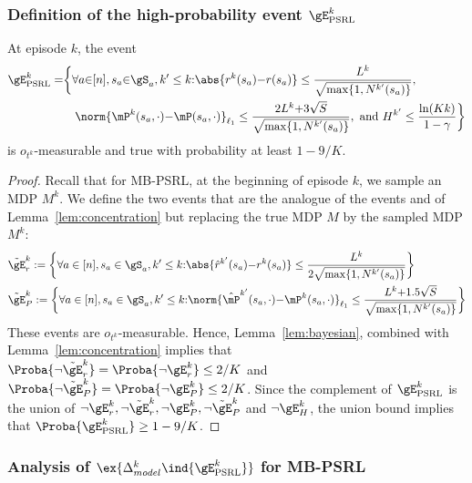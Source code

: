 \begin{subappendices}
\subsubsection{Definition of the high-probability event $\gE_\text{PSRL}^{k}$}

\begin{lem}
    \label{lem:concentration_psrl}
    At episode $k$, the event
    \begin{align*}
        \gE_\text{PSRL}^{k} =
        &\bigg\{ \forall a{\in}[n], s_a{\in}\gS_a, k'\le k{:}
            \abs{r^{k}(s_a){-}r(s_a)} \le\frac{L^{k}}{\sqrt{\max\{1,N^{k'}(s_a)\} }}, \\
        &\quad\norm{\mP^{k}(s_a,\cdot) {-}\mP(s_a,\cdot)}_{\ell_1} \le\frac{2L^{k}{+}3\sqrt{S}}{\sqrt{\max\{1,N^{k'}(s_a)\} }}, \text{ and } H^{k'}\le \frac{\ln(Kk)}{1-\gamma} \bigg\}
    \end{align*}
    is $o_{t^k}$-measurable and true with probability at least $1-9/K$.
\end{lem}

\begin{proof}
    Recall that for MB-PSRL, at the beginning of episode $k$, we sample an MDP $M^{k}$. We define the two events that are the analogue of the events  and  of Lemma~\ref{lem:concentration} but replacing the true MDP $M$ by the sampled MDP $M^{k}$: 
    \begin{align*}
        &\tilde{\gE}^{k}_r:= \bigg\{\forall a\in[n], s_a\in\gS_a, k'\le k{:} \abs{\hat{r}^{k'}(s_a){-}r^{k}(s_a)} \le \frac{L^{k}}{2\sqrt{\max\{1,N^{k'}(s_a)\} }}\bigg\} \\
        &\tilde{\gE}^{k}_P:= \bigg\{\forall a\in[n], s_a\in\gS_a, k'\le k{:} \norm{\hat{\mP}^{k'}(s_a,\cdot){-}\mP^{k}(s_a, \cdot)}_{\ell_1} \le \frac{L^{k}{+}1.5\sqrt{S}}{\sqrt{\max\{1,N^{k'}(s_a)\} }}\bigg\} 
    \end{align*}
    These events are $o_{t^k}$-measurable. Hence, Lemma~\ref{lem:bayesian}, combined with Lemma~\ref{lem:concentration} implies that $\Proba{ \lnot \tilde{\gE}^{k}_r} =\Proba{ \lnot \gE^{k}_r}\le 2/K$ and $\Proba{\lnot \tilde{\gE}^{k}_P}=\Proba{ \lnot \gE^{k}_P}\le 2/K$. Since the complement of $\gE^{k}_\text{PSRL}$ is the union of $\lnot \gE^{k}_r, \lnot \tilde{\gE}^{k}_r, \lnot \gE^{k}_P, \lnot \tilde{\gE}^{k}_P$ and $\lnot \gE^{k}_H$, the union bound implies that $\Proba{\gE_\text{PSRL}^{k}}\ge1-9/K$.
\end{proof}

\subsubsection{Analysis of $\ex{\Delta_{model}^k \ind{\gE^{k}_\text{PSRL}}}$ for MB-PSRL}


\end{subappendices}

